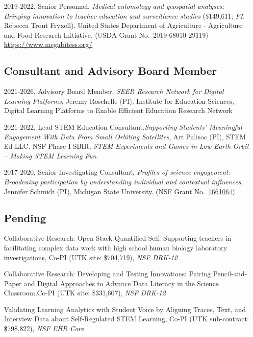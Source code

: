 \documentclass[
  14,
]{article}
\begin{document}
2019-2022, Senior Personnel, \emph{Medical entomology and geospatial
analyses: Bringing innovation to teacher education and surveillance
studies} (\$149,611; \emph{PI}: Rebecca Trout Fryxell). United States
Department of Agriculture - Agriculture and Food Research Initiative.
(USDA Grant No.~2019-68010-29119) \url{https://www.megabitess.org/}

\hypertarget{consultant-and-advisory-board-member}{%
\subsection{Consultant and Advisory Board
Member}\label{consultant-and-advisory-board-member}}

2021-2026, Advisory Board Member, \emph{SEER Research Network for
Digital Learning Platforms}, Jeremy Roschelle (PI), Institute for
Education Sciences, Digital Learning Platforms to Enable Efficient
Education Research Network

2021-2022, Lead STEM Education Consultant,\emph{Supporting Students'
Meaningful Engagement With Data From Small Orbiting Satellites}, Art
Palisoc (PI), STEM Ed LLC, NSF Phase I SBIR, \emph{STEM Experiments and
Games in Low Earth Orbit -- Making STEM Learning Fun}

2017-2020, Senior Investigating Consultant, \emph{Profiles of science
engagement: Broadening participation by understanding individual and
contextual influences}, Jennifer Schmidt (PI), Michigan State
University. (NSF Grant
No.~\href{https://nsf.gov/awardsearch/showAward?AWD_ID=1661064\&HistoricalAwards=false}{1661064})

\hypertarget{pending}{%
\subsection{Pending}\label{pending}}

Collaborative Research: Open Stack Quantified Self: Supporting teachers
in facilitating complex data work with high school human biology
laboratory investigations, Co-PI (UTK site: \$704,719), \emph{NSF
DRK-12}

Collaborative Research: Developing and Testing Innovations: Pairing
Pencil-and-Paper and Digital Approaches to Advance Data Literacy in the
Science Classroom,Co-PI (UTK site: \$331,607), \emph{NSF DRK-12}

Validating Learning Analytics with Student Voice by Aligning Traces,
Text, and Interview Data about Self-Regulated STEM Learning, Co-PI (UTK
sub-contract: \$798,822), \emph{NSF EHR Core}
\end{document}
